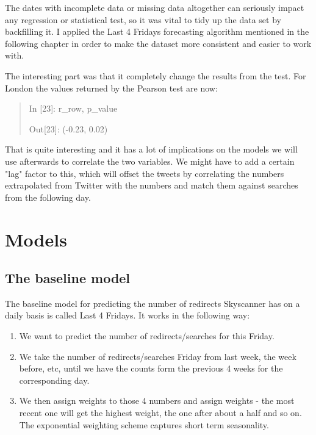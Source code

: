 \documentclass[minf,frontabs,twoside,singlespacing,parskip]{infthesis}
\begin{document}
The dates with incomplete data or missing data altogether can seriously impact any regression or statistical test, so it was vital to tidy up the data set by backfilling it. I applied the Last 4 Fridays forecasting algorithm mentioned in the following chapter in order to make the dataset more consistent and easier to work with. 

The interesting part was that it completely change the results from the test. For London the values returned by the Pearson test are now:

\begin{quotation}
In [23]: r\_row, p\_value

Out[23]: (-0.23, 0.02)
\end{quotation}

That is quite interesting and it has a lot of implications on the models we will use afterwards to correlate the two variables. 
We might have to add a certain "lag" factor to this, which will offset the tweets by correlating the numbers extrapolated from Twitter with the numbers and match them against searches from the following day.




\chapter{Models}
\label{chap:model}

\section{The baseline model}

The baseline model for predicting the number of redirects Skyscanner has on a daily basis is called Last 4 Fridays. 
It works in the following way:
\begin{enumerate}
\item We want to predict the number of redirects/searches for this Friday.
\item We take the number of redirects/searches Friday from last week, the week before, etc, until we have the counts form the previous 4 weeks for the corresponding day.
\item We then assign weights to those 4 numbers and assign weights - the most recent one will get the highest weight, the one after about a half and so on. The exponential weighting scheme captures short term seasonality.
\end{enumerate}
\end{document}
